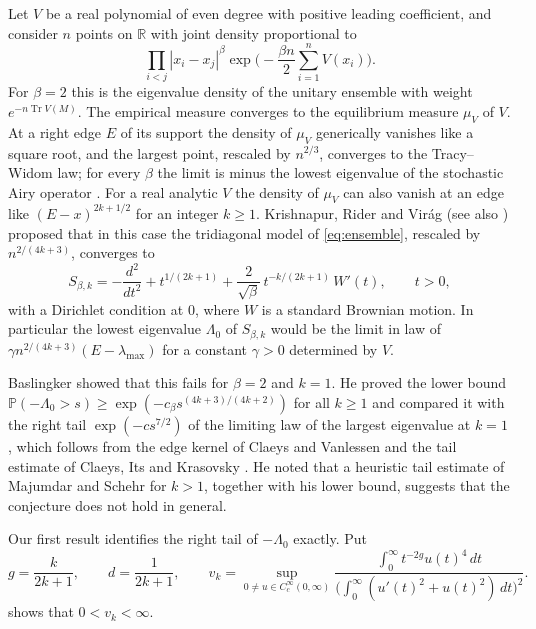 \documentclass[11pt]{article}
\theoremstyle{remark}
\newcommand{\Prob}{\mathbb{P}}
\newcommand{\R}{\mathbb{R}}
\begin{document}
Let $V$ be a real polynomial of even degree with positive leading coefficient, and consider $n$ points on $\R$ with
joint density proportional to
\begin{equation}\label{eq:ensemble}
\prod_{i<j}|x_i-x_j|^{\beta}\exp\Big(-\frac{\beta n}{2}\sum_{i=1}^n V(x_i)\Big).
\end{equation}
For $\beta=2$ this is the eigenvalue density of the unitary ensemble with weight $e^{-n\operatorname{Tr}V(M)}$. The
empirical measure converges to the equilibrium measure $\mu_V$ of $V$. At a right edge $E$ of its support the density
of $\mu_V$ generically vanishes like a square root, and the largest point, rescaled by $n^{2/3}$, converges to the
Tracy--Widom law; for every $\beta$ the limit is minus the lowest eigenvalue of the stochastic Airy operator
\cite{RRV,KRV}. For a real analytic $V$ the density of $\mu_V$ can also vanish at an edge like $(E-x)^{2k+1/2}$ for an
integer $k\ge1$. Krishnapur, Rider and Vir\'ag \cite[Conjecture~45]{KRVarxiv} (see also \cite[Conjecture~5]{Virag})
proposed that in this case the tridiagonal model of \eqref{eq:ensemble}, rescaled by $n^{2/(4k+3)}$, converges to
\begin{equation}\label{eq:operator}
S_{\beta,k}=-\frac{d^2}{dt^2}+t^{1/(2k+1)}+\frac{2}{\sqrt\beta}\,t^{-k/(2k+1)}\,W'(t),\qquad t>0,
\end{equation}
with a Dirichlet condition at $0$, where $W$ is a standard Brownian motion. In particular the lowest eigenvalue
$\Lambda_0$ of $S_{\beta,k}$ would be the limit in law of $\gamma n^{2/(4k+3)}(E-\lambda_{\max})$ for a constant
$\gamma>0$ determined by $V$.

Baslingker \cite{Bas} showed that this fails for $\beta=2$ and $k=1$. He proved the lower bound
$\Prob(-\Lambda_0>s)\ge\exp(-c_\beta s^{(4k+3)/(4k+2)})$ for all $k\ge1$ and compared it with the right tail
$\exp(-cs^{7/2})$ of the limiting law of the largest eigenvalue at $k=1$ \cite[(16)]{Bas}, which follows from the
edge kernel of Claeys and Vanlessen \cite{CV} and the tail estimate of Claeys, Its and Krasovsky \cite{CIK}. He noted
\cite[Remark~3]{Bas} that a heuristic tail estimate of Majumdar and Schehr \cite{MS} for $k>1$, together with his lower
bound, suggests that the conjecture does not hold in general.

Our first result identifies the right tail of $-\Lambda_0$ exactly. Put
\begin{equation}\label{eq:gd}
g=\frac{k}{2k+1},\qquad d=\frac1{2k+1},\qquad
v_k=\sup_{0\ne u\in C_c^\infty(0,\infty)}\frac{\int_0^\infty t^{-2g}u(t)^4\,dt}{\bigl(\int_0^\infty(u'(t)^2+u(t)^2)\,dt\bigr)^2}.
\end{equation}
 shows that $0<v_k<\infty$.
\end{document}
